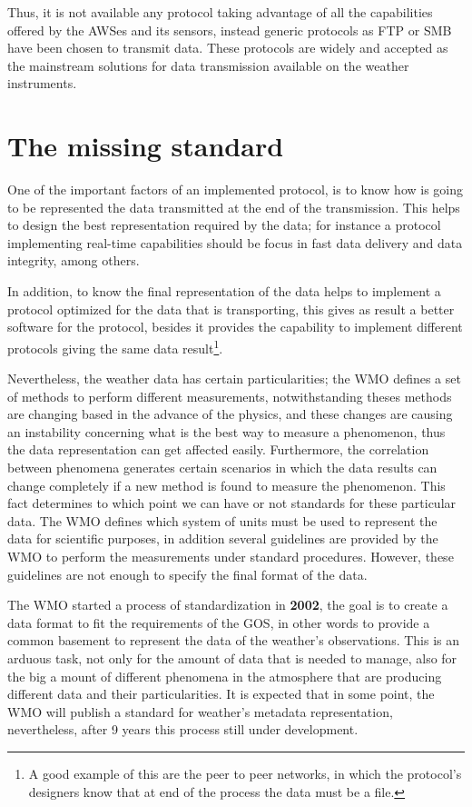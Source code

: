 Thus, it is not available any protocol taking advantage of all the capabilities offered by the \gls{AWS}es and its sensors, instead generic protocols as \gls{FTP}  or \gls{SMB} have been chosen to transmit data. These protocols are widely and accepted as the mainstream solutions for data transmission available on the weather instruments. 

\section{The missing standard}\label{missingstd}

One of the important factors of an implemented protocol, is to know how is going to be represented the data transmitted at the end of the transmission. This helps to design the best representation required by the data; for instance a protocol implementing real-time capabilities should be focus in fast data delivery and data integrity, among others.

In addition, to know the final representation of the data helps to implement a protocol optimized for the data that is transporting, this gives as result a better software for the protocol, besides it provides the capability to implement different protocols giving the same data result\footnote{A good example of this are the peer to peer networks, in which the protocol's designers know that at end of the process the data must be a file.}. 

Nevertheless, the weather data has certain particularities; the \gls{WMO} defines a set of methods to perform different measurements, notwithstanding theses methods are changing based in the advance of the physics, and these changes are causing an instability concerning what is the best way to measure a phenomenon, thus the data representation can get affected easily. Furthermore, the correlation between phenomena generates certain scenarios in which the data results can change completely if a new method is found to measure the phenomenon. This fact determines to which point we can have or not standards for these particular data. The \gls{WMO} defines which system of units must be used to represent the data for scientific purposes, in addition several guidelines are provided by the \gls{WMO} to perform the measurements under standard procedures. However, these guidelines are not enough to specify the final format of the data.

The \gls{WMO} started a process of standardization in \textbf{2002}, the goal is to create a data format to fit the requirements of the \gls{GOS}, in other words to provide a common basement to represent the data of the weather's observations. This is an arduous task, not only for the amount of data that is needed to manage, also for the big a mount of different phenomena in the atmosphere that are producing different data and their particularities. It is expected that in some point, the \gls{WMO} will publish a standard for weather's metadata representation, nevertheless, after 9 years this process still under development.

